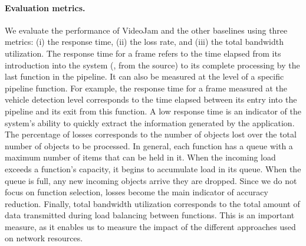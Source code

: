 \paragraph{Evaluation metrics.} We evaluate the performance of VideoJam and the other baselines using three metrics: (i) the response time, (ii) the loss rate, and (iii) the total bandwidth utilization. The response time for a frame refers to the time elapsed from its introduction into the system (\ie, from the source)
to its complete processing by the last function in the pipeline. It can also be measured at the level of a specific pipeline function. For example, the response time for a frame measured at the vehicle detection level corresponds to the time elapsed between its entry into the pipeline and its exit from this function. A low response time is an indicator of the system's ability to quickly extract the
information generated by the application. The percentage of losses corresponds to the number of objects lost over the total number of objects to be processed.
In general, each function has a queue with a maximum number of items that can be held in it. When the incoming load exceeds a function's capacity, it begins to accumulate load in its queue. When the queue is full, any new incoming objects arrive they are dropped. Since we do not focus on function selection, losses
become the main indicator of accuracy reduction. Finally, total bandwidth utilization corresponds to the total amount of data transmitted during load balancing between functions. This is an important measure, as it enables us to measure the impact of the different approaches used on network resources.

